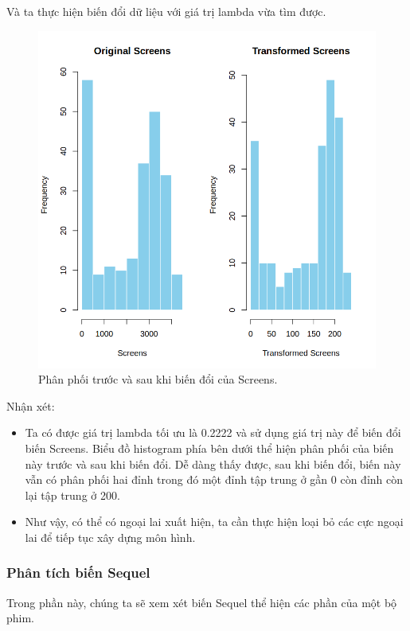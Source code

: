Và ta thực hiện biến đổi dữ liệu với giá trị lambda vừa tìm được.
\begin{figure}[H]
    \centering
    \includegraphics[width=0.75\columnwidth]{csm_figures/screens_transformed_distribution.png}
    \caption{Phân phối trước và sau khi biến đổi của Screens.}
    \label{fig:screens_transformed_distribution}
\end{figure}
Nhận xét:
\begin{itemize}
    \item Ta có được giá trị lambda tối ưu là 0.2222 và sử dụng giá trị này để biến đổi biến Screens. Biểu đồ histogram phía bên dưới thể hiện phân phối của biến này trước và sau khi biến đổi. Dễ dàng thấy được, sau khi biến đổi, biến này vẫn có phân phối hai đỉnh trong đó một đỉnh tập trung ở gần 0 còn đỉnh còn lại tập trung ở 200.
    \item Như vậy, có thể có ngoại lai xuất hiện, ta cần thực hiện loại bỏ các cực ngoại lai để tiếp tục xây dựng môn hình.
\end{itemize}

\subsubsection{Phân tích biến Sequel}

Trong phần này, chúng ta sẽ xem xét biến Sequel thể hiện các phần của một bộ phim.

